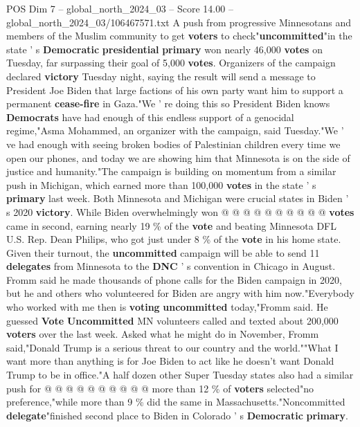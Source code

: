 \begin{textsample}{POS Dim 7 – global\_north\_2024\_03 – Score 14.00 – global\_north\_2024\_03/106467571.txt}  \label{ex:f7_pos_032}
A push from progressive Minnesotans and members of the Muslim community to get \textbf{voters} to check"\textbf{uncommitted}"in the state ' s \textbf{Democratic} \textbf{presidential} \textbf{primary} won nearly 46,000 \textbf{votes} on Tuesday, far surpassing their goal of 5,000 \textbf{votes}.
Organizers of the campaign declared \textbf{victory} Tuesday night, saying the result will send a message to President Joe Biden that large factions of his own party want him to support a permanent \textbf{cease-fire} in Gaza."We ' re doing this so President Biden knows \textbf{Democrats} have had enough of this endless support of a genocidal regime,"Asma Mohammed, an organizer with the campaign, said Tuesday."We ' ve had enough with seeing broken bodies of Palestinian children every time we open our phones, and today we are showing him that Minnesota is on the side of justice and humanity."The campaign is building on momentum from a similar push in Michigan, which earned more than 100,000 \textbf{votes} in the state ' s \textbf{primary} last week.
Both Minnesota and Michigan were crucial states in Biden ' s 2020 \textbf{victory}.
While Biden overwhelmingly won @ @ @ @ @ @ @ @ @ @ \textbf{votes} came in second, earning nearly 19 \% of the \textbf{vote} and beating Minnesota DFL U.S.
Rep.
Dean Philips, who got just under 8 \% of the \textbf{vote} in his home state.
Given their turnout, the \textbf{uncommitted} campaign will be able to send 11 \textbf{delegates} from Minnesota to the \textbf{DNC} ' s convention in Chicago in August.
Fromm said he made thousands of phone calls for the Biden campaign in 2020, but he and others who volunteered for Biden are angry with him now."Everybody who worked with me then is \textbf{voting} \textbf{uncommitted} today,"Fromm said.
He guessed \textbf{Vote} \textbf{Uncommitted} MN volunteers called and texted about 200,000 \textbf{voters} over the last week.
Asked what he might do in November, Fromm said,"Donald Trump is a serious threat to our country and the world.""What I want more than anything is for Joe Biden to act like he doesn't want Donald Trump to be in office."A half dozen other Super Tuesday states also had a similar push for @ @ @ @ @ @ @ @ @ @ more than 12 \% of \textbf{voters} selected"no preference,"while more than 9 \% did the same in Massachusetts."Noncommitted \textbf{delegate}"finished second place to Biden in Colorado ' s \textbf{Democratic} \textbf{primary}.

\end{textsample}
